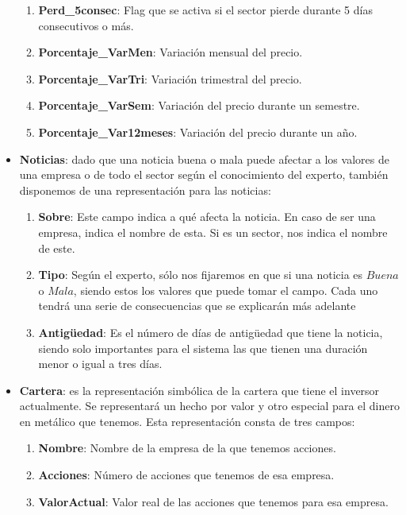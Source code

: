 \documentclass[10pt,spanish]{article}
\theoremstyle{plain}
\theoremstyle{definition}
\begin{document}
\begin{itemize}
\begin{enumerate}[$\diamond$]
        \item \textbf{Perd\_5consec}: Flag que se activa si el sector pierde durante 5 días consecutivos o más.
        
        \item \textbf{Porcentaje\_VarMen}: Variación mensual del precio.
        
        \item \textbf{Porcentaje\_VarTri}: Variación trimestral del precio.
        
        \item \textbf{Porcentaje\_VarSem}: Variación del precio durante un semestre.
        
        \item \textbf{Porcentaje\_Var12meses}: Variación del precio durante un año.
    \end{enumerate}

    \item \textbf{Noticias}: dado que una noticia buena o mala puede afectar a los valores de una empresa o de todo el sector según el conocimiento del experto, también disponemos de una representación para las noticias:
    \begin{enumerate}[$\diamond$]
        \item \textbf{Sobre}: Este campo indica a qué afecta la noticia. En caso de ser una empresa, indica el nombre de esta. Si es un sector, nos indica el nombre de este.
        \item \textbf{Tipo}: Según el experto, sólo nos fijaremos en que si una noticia es $Buena$ o $Mala$, siendo estos los valores que puede tomar el campo. Cada uno tendrá una serie de consecuencias que se explicarán más adelante
        \item \textbf{Antigüedad}: Es el número de días de antigüedad que tiene la noticia, siendo solo importantes para el sistema las que tienen una duración menor o igual a tres días.
    \end{enumerate}

    \item \textbf{Cartera}: es la representación simbólica de la cartera que tiene el inversor actualmente. Se representará un hecho por valor y otro especial para el dinero en metálico que tenemos. Esta representación consta de tres campos:
    \begin{enumerate}[$\diamond$]
        \item \textbf{Nombre}: Nombre de la empresa de la que tenemos acciones.
        \item \textbf{Acciones}: Número de acciones que tenemos de esa empresa.
        \item \textbf{ValorActual}: Valor real de las acciones que tenemos para esa empresa.
    \end{enumerate}
\end{itemize}
\end{document}
